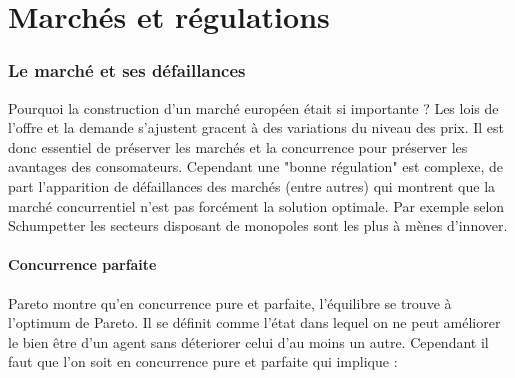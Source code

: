 

\part{Marchés et régulations} %
\label{prt:marches_et_regulations}

\section{Le marché et ses défaillances} %
\label{sec:le_marche_et_ses_defaillances}

Pourquoi la construction d'un marché européen était si importante ? Les lois de l'offre et la demande s'ajustent gracent à des variations du niveau des prix. Il est donc essentiel de préserver les marchés et la concurrence pour préserver les avantages des consomateurs. Cependant une "bonne régulation" est complexe, de part l'apparition de défaillances des marchés (entre autres) qui montrent que la marché concurrentiel n'est pas forcément la solution optimale. Par exemple selon Schumpetter les secteurs disposant de monopoles sont les plus à mènes d'innover.

\subsection{Concurrence parfaite} %
\label{sub:concurrence_parfaite}

Pareto montre qu'en concurrence pure et parfaite, l'équilibre se trouve à l'optimum de Pareto. Il se définit comme l'état dans lequel on ne peut améliorer le bien être d'un agent sans déteriorer celui d'au moins un autre. Cependant il faut que l'on soit en concurrence pure et parfaite qui implique : 

